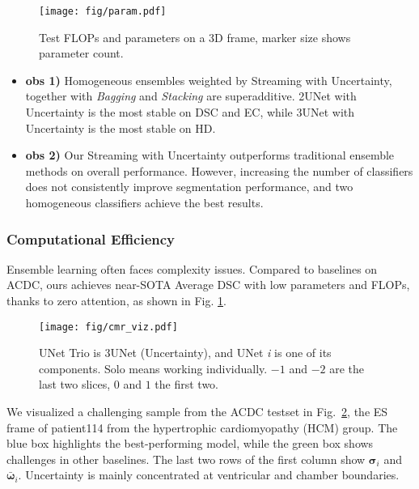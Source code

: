 \begin{figure}
    \centering
    \texttt{[image: fig/param.pdf]}
    \caption{Test FLOPs and parameters on a 3D frame, marker size shows parameter count.}
    \label{fig:param}
\end{figure}


\begin{itemize}
    \item \textbf{obs 1)} Homogeneous ensembles weighted by Streaming with Uncertainty, together with \textit{Bagging} and \textit{Stacking} are superadditive. 2UNet with Uncertainty is the most stable on DSC and EC, while 3UNet with Uncertainty is the most stable on HD.

    \item \textbf{obs 2)} Our Streaming with Uncertainty outperforms traditional ensemble methods on overall performance. However, increasing the number of classifiers does not consistently improve segmentation performance, and two homogeneous classifiers achieve the best results.
\end{itemize}

\subsubsection{Computational Efficiency} Ensemble learning often faces complexity issues. Compared to baselines on ACDC, ours achieves near-SOTA Average DSC with low parameters and FLOPs, thanks to zero attention, as shown in Fig. \ref{fig:param}.

\begin{figure}
    \centering
    \texttt{[image: fig/cmr\_viz.pdf]}
    \caption{UNet Trio is 3UNet (Uncertainty), and UNet \textit{i} is one of its components. Solo means working individually. $-1$ and $-2$ are the last two slices, $0$ and $1$ the first two.}
    \label{fig:cmr viz}
\end{figure}

We visualized a challenging sample from the ACDC testset in Fig.~\ref{fig:cmr viz}, the ES frame of patient114 from the hypertrophic cardiomyopathy (HCM) group. The blue box highlights the best-performing model, while the green box shows challenges in other baselines. The last two rows of the first column show \(\boldsymbol{\sigma}_{i}\) and \(\bar{\boldsymbol{\omega}}_{i}\). Uncertainty is mainly concentrated at ventricular and chamber boundaries.

